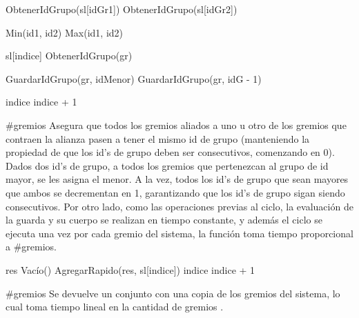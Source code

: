 {
	\state {} \asig ObtenerIdGrupo(sl[idGr1])						
	\state {} \asig ObtenerIdGrupo(sl[idGr2])						
	\state 

													
		
		\state {} \asig Min(id1, id2)						
		\state {} \asig Max(id1, id2)						
		\state

		\state {} 										

										
			\state

			\state {} \asig sl[indice]					
			\state {} \asig ObtenerIdGrupo(gr)					
			\state

															
				\state GuardarIdGrupo(gr, idMenor)								
			\Else {}										
					\state GuardarIdGrupo(gr, idG - 1)							
				\endif
			\endif
			\state

			\state indice \asig indice + 1										
		\endwhile
	
		
	\endif
}
{\#gremios}
{ Asegura que todos los gremios aliados a uno u otro de los gremios que contraen la alianza pasen a tener el mismo id de grupo (manteniendo la propiedad de que los id's de grupo deben ser consecutivos, comenzando en 0).}
{ Dados dos id's de grupo, a todos los gremios que pertenezcan al grupo de id mayor, se les asigna el menor. A la vez, todos los id's de grupo que sean mayores que ambos se decrementan en 1, garantizando que los id's de grupo sigan siendo consecutivos.
\hspace{10pt} Por otro lado, como las operaciones previas al ciclo, la evaluaci\'on de la guarda y su cuerpo se realizan en tiempo constante, y adem\'as el ciclo se ejecuta una vez por cada gremio del sistema, la funci\'on toma tiempo proporcional a \#gremios. }

{
	\state res \asig Vac\'io() 
	\state {} 					
	\state 	
						
		\state 
		\state AgregarRapido(res, sl[indice])				
		\state
		\state indice \asig indice + 1					
	\endwhile

}
{\#gremios}
{ Se devuelve un conjunto con una copia de los gremios del sistema, lo cual toma tiempo lineal en la cantidad de gremios . }

